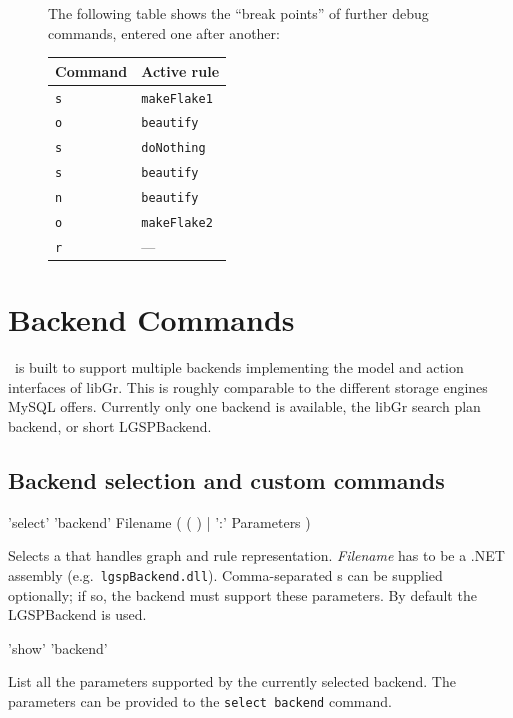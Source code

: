 \begin{figure}[htbp]
\begin{example}
\begin{center}
\end{center}
The following table shows the ``break points'' of further debug commands, entered one after another:
\begin{center}
  \begin{tabular}{|l|l|} \hline
    \textbf{Command} & \textbf{Active rule} \\ \hline
    \texttt{s} & \texttt{makeFlake1} \\
    \texttt{o} & \texttt{beautify} \\
    \texttt{s} & \texttt{doNothing} \\
    \texttt{s} & \texttt{beautify} \\ 
    \texttt{n} & \texttt{beautify} \\ 
    \texttt{o} & \texttt{makeFlake2} \\
    \texttt{r} & --- \\ \hline
  \end{tabular}
\end{center}
\end{example}   
\end{figure}


\section{Backend Commands}
\label{backend}

\GrG\ is built to support multiple backends implementing the model and action interfaces of libGr.
This is roughly comparable to the different storage engines MySQL offers.
Currently only one backend is available, the libGr search plan backend, or short LGSPBackend.

\subsection{Backend selection and custom commands}

\begin{rail}
  'select' 'backend' Filename ( ( ) | ':' Parameters )
\end{rail}
Selects a  that handles graph and rule representation.
\emph{Filename} has to be a .NET assembly (e.g.\ \texttt{lgspBackend.dll}).
Comma-separated s can be supplied optionally; if so, the backend must support these parameters.
By default the LGSPBackend is used.

\begin{rail}
  'show' 'backend'
\end{rail}\nopagebreak{}
List all the parameters supported by the currently selected backend.
The parameters can be provided to the \texttt{select backend} command.

